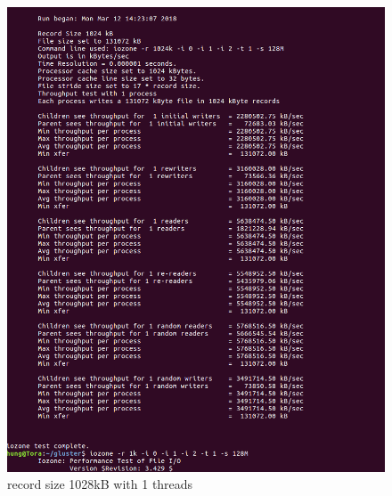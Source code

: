 \documentclass[12pt]{article}
\begin{document}
     \begin{figure}[H]
        \centering
       \includegraphics[scale=0.4]{1024kB 1 proccesses.png}
       \caption{record size 1028kB with 1 threads}
    \end{figure}
\end{document}
